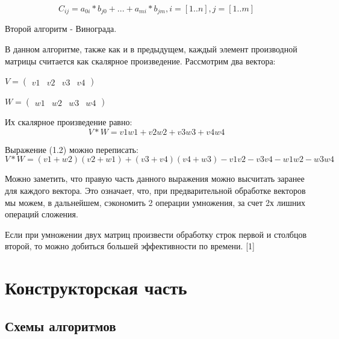 \documentclass[12pt]{report}
\begin{document}
\begin{equation}
C_{ij} = a_{0i} * b_{j0} + ... + a_{mi} * b_{jm},  i = [1..n], j = [1..m]
\end{equation}

Второй алгоритм - Винограда.

В данном алгоритме, также как и в предыдущем, каждый элемент производной матрицы считается как скалярное произведение.
Рассмотрим два вектора:
\begin{center}
{$
V = 
\begin{pmatrix}
  v1 & v2 & v3 & v4
\end{pmatrix}
$}

{$
W = 
\begin{pmatrix}
  w1 & w2 & w3 & w4
\end{pmatrix}
$}
\end{center}

Их скалярное произведение равно:
\begin{equation}
V*W = v1w1 + v2w2 + v3w3 + v4w4
\end{equation}

Выражение (1.2) можно переписать:
\begin{equation}
V*W = (v1 + w2)(v2 + w1) + (v3 + v4)(v4 + w3) - v1v2 - v3v4 - w1w2 - w3w4
\end{equation}

Можно заметить, что правую часть данного выражения можно высчитать заранее для каждого вектора.
Это означает, что, при предварительной обработке векторов мы можем, в дальнейшем, сэкономить 2 операции умножения, за счет 2х лишних операций сложения.

Если при умножении двух матриц произвести обработку строк первой и столбцов второй, то можно добиться большей эффективности по времени. [1]

\chapter{Конструкторская часть}
\section{Схемы алгоритмов}
\end{document}
